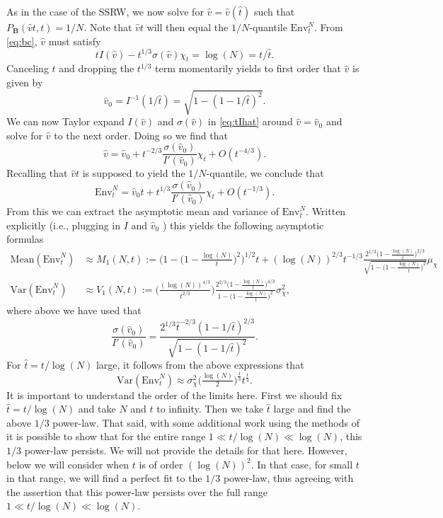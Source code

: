 \documentclass[letter,reqno, 11pt, oneside]{amsart}
\newcommand{\envnt}{\text{Env}_t^N}
\newcommand{\mean}[1]{\mathrm{Mean}\left(#1\right)}
\newcommand{\var}[1]{\mathrm{Var}\left(#1\right)}
\begin{document}
As in the case of the SSRW, we now solve for $\hat v=\hat v(\hat t)$ such that $P_{\mathbf{B}}(\hat vt,t)= 1/N$. Note that $\hat vt$ will then equal the $1/N$-quantile $\envnt$. From \eqref{eq:bc}, $\hat v$ must satisfy
\begin{equation}\label{eq:tIhat}
t I(\hat v) - t^{1/3} \sigma(\hat v) \chi_t =\log(N) = t/\hat{t}.
\end{equation}
Canceling $t$ and dropping the $t^{1/3}$ term momentarily yields to first order that $\hat v$ is given by
$$\hat v_0 = I^{-1}(1/\hat{t}) = \sqrt{1-(1-1/\hat{t})^2}.$$
We can now Taylor expand $I(\hat{v})$ and $\sigma(\hat v)$ in \eqref{eq:tIhat} around $\hat{v}=\hat{v}_0$ and solve for $\hat{v}$ to the next order. Doing so we find that
$$\hat{v} = \hat{v}_0 + t^{-2/3} \frac{\sigma(\hat{v}_0)}{I'(\hat{v}_0)} \chi_t + O(t^{-4/3}).$$
Recalling that $\hat{v} t$ is supposed to yield the $1/N$-quantile, we conclude that
\begin{equation}\label{eq:envntform}
\envnt = \hat v_0 t + t^{1/3} \frac{\sigma(\hat v_0)}{I'(\hat v_0)}  \chi_t + O(t^{-1/3}).
\end{equation}
From this we can extract the asymptotic mean and variance of $\envnt$. Written explicitly (i.e., plugging in $I$ and $\hat{v}_0$
) this yields the following asymptotic formulas
\begin{align*}
\mean{\envnt} &\approx M_1(N,t):= \Big(1-\big(1-\tfrac{\log(N)}{t}\big)^2\Big)^{1/2} t  +(\log(N))^{2/3} t^{-1/3}  \frac{2^{1/3} \big(1-\frac{\log(N)}{t}\big)^{2/3}}{\sqrt{1-\big(1-\frac{\log(N)}{t}\big)^2}} \mu_{\chi} \\
\var{\envnt}  &\approx V_1(N,t):= \Big(\frac{(\log(N))^{4/3}}{t^{2/3}}\Big)\frac{2^{2/3}\big(1-\frac{\log(N)}{t}\big)^{4/3}}{1- \big(1- \frac{\log (N)}{t}\big)^2} \sigma_{\chi}^2 ,
\end{align*}
where above we have used that
$$
\frac{\sigma(\hat{v}_0)}{I'(\hat{v}_0)}  = \frac{2^{1/3} \hat{t}^{-2/3} (1-1/\hat{t})^{2/3}}{\sqrt{1-(1-1/\hat{t})^2}}.
$$
For $\hat{t}=t/\log(N)$ large, it follows from the above expressions that
\begin{equation}\label{eq:varenvlogN}
\var{\envnt}  \approx  \sigma_{\chi}^2 \big(\tfrac{\log(N)}{2}\big)^{\frac{1}{3}} t^{\frac{1}{3}}.
\end{equation}
It is important to understand the order of the limits here. First we should fix $\hat{t}=t/\log(N)$ and take $N$ and $t$ to infinity. Then we take $\hat{t}$ large and find the above $1/3$ power-law. That said, with some additional work using the methods of  \cite{barraquandRandomwalkBetadistributedRandom2017a} it is possible to show that for the entire range $1\ll t/\log(N) \ll \log(N)$, this $1/3$ power-law persists. We will not provide the details for that here. However, below we will consider when $t$ is of order $(\log(N))^2$. In that case, for small $t$ in that range, we will find a perfect fit to the $1/3$ power-law, thus agreeing with the assertion that this power-law persists over the full range $1\ll t/\log(N) \ll \log(N)$.
\end{document}
